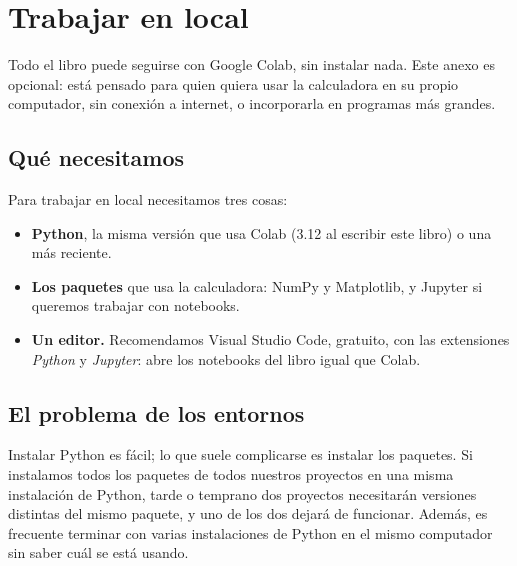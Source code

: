 \chapter{Trabajar en local}\label{cap:trabajar_en_local}

Todo el libro puede seguirse con Google Colab, sin instalar nada. Este anexo es
opcional: está pensado para quien quiera usar la calculadora en su propio
computador, sin conexión a internet, o incorporarla en programas más grandes.

\section{Qué necesitamos}\label{sec:c_requisitos}

Para trabajar en local necesitamos tres cosas:
\begin{itemize}
  \item \textbf{Python}, la misma versión que usa Colab (3.12 al escribir este
    libro) o una más reciente.
  \item \textbf{Los paquetes} que usa la calculadora: NumPy y Matplotlib, y
    Jupyter si queremos trabajar con notebooks.
  \item \textbf{Un editor.} Recomendamos Visual Studio Code, gratuito, con
    las extensiones \emph{Python} y \emph{Jupyter}: abre los notebooks del
    libro igual que Colab.
\end{itemize}

\section{El problema de los entornos}\label{sec:c_entornos}

Instalar Python es fácil; lo que suele complicarse es instalar los paquetes.
Si instalamos todos los paquetes de todos nuestros proyectos en una misma
instalación de Python, tarde o temprano dos proyectos necesitarán versiones
distintas del mismo paquete, y uno de los dos dejará de funcionar. Además, es
frecuente terminar con varias instalaciones de Python en el mismo computador
sin saber cuál se está usando.

